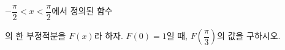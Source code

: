 $-\dfrac{\pi}{2}<x<\dfrac{\pi}{2}$에서 정의된 함수 \par\smallskip{}\par\smallskip\noindent 의 한 부정적분을 $F(x)$라 하자. $F(0)=1$일 때, $F\!\left(\dfrac{\pi}{3}\right)$의 값을 구하시오.
